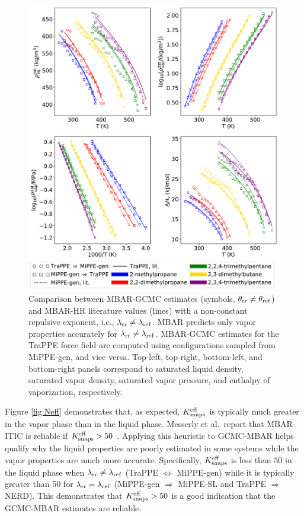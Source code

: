 \documentclass[journal=jced,manuscript=article]{achemso}
\begin{document}
	\begin{figure}[H]
		\centering
		\includegraphics[width=6.4in]{refFF_to_rrFF_lam_12to16.pdf}
		\caption{Comparison between MBAR-GCMC estimates (symbols, $\theta_{\rm rr} \neq \theta_{\rm ref}$) and MBAR-HR literature values\cite{Potoff_branched} (lines) with a non-constant repulsive exponent, i.e., $\lambda_{\rm rr} \neq \lambda_{\rm ref}$. MBAR predicts only vapor properties accurately for $\lambda_{\rm rr} \neq \lambda_{\rm ref}$. MBAR-GCMC estimates for the TraPPE force field are computed using configurations sampled from MiPPE-gen, and vice versa. Top-left, top-right, bottom-left, and bottom-right panels correspond to saturated liquid density, saturated vapor density, saturated vapor pressure, and enthalpy of vaporization, respectively.}
		\label{fig:refFF_to_rrFF_lam12to16}
	\end{figure}
Figure \ref{fig:Neff} demonstrates that, as expected, $K_{\rm snaps}^{\rm eff}$ is typically much greater in the vapor phase than in the liquid phase. Messerly et al.~report that MBAR-ITIC is reliable if $K_{\rm snaps}^{\rm eff} > 50$ \cite{Postdoc_1}. Applying this heuristic to GCMC-MBAR helps qualify why the liquid properties are poorly estimated in some systems while the vapor properties are much more accurate. Specifically, $K_{\rm snaps}^{\rm eff}$ is less than $50$ in the liquid phase when $\lambda_{\rm rr} \neq \lambda_{\rm ref}$ (TraPPE $\Leftrightarrow$ MiPPE-gen) while it is typically greater than 50 for $\lambda_{\rm rr} = \lambda_{\rm ref}$ (MiPPE-gen $\Rightarrow$ MiPPE-SL and TraPPE $\Rightarrow$ NERD). This demonstrates that $K_{\rm snaps}^{\rm eff} > 50$ is a good indication that the GCMC-MBAR estimates are reliable.
\end{document}
